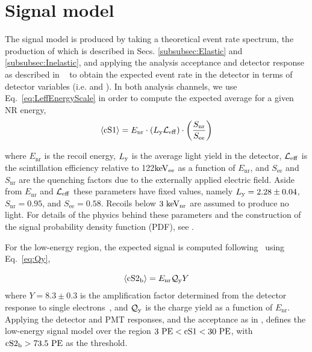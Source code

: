 \section{Signal model}
\label{subsec:SignalModel}
The signal model is produced by taking a theoretical event rate spectrum, the production of which is described in Secs. \ref{subsubsec:Elastic} and \ref{subsubsec:Inelastic}, and applying the analysis acceptance and detector response as described in ~\cite{Aprile:2012vw}  to obtain the expected event rate in the detector in terms of detector variables (i.e. \cSi{} and \cSiib{}). 
In both analysis channels, we use Eq.~\ref{eq:LeffEnergyScale} in order to compute the expected average \cSi{} for a given NR energy,
\begin{equation}
\label{eq:LeffEnergyScale}
	\langle \mathrm{cS1} \rangle = E_{\mathrm{nr}} \cdot (L_{\mathrm{y}} \mathcal{L}_{\mathrm{eff}}) \cdot   \left(\frac{S_\mathrm{nr}}{S_\mathrm{ee}}\right) 
\end{equation}

where $E_\mathrm{nr}$ is the recoil energy, $L_{\mathrm{y}}$ is the average light yield in the detector, $\mathcal{L}_{\mathrm{eff}}$ is the scintillation efficiency relative to 122$\mathrm{keV_\mathrm{ee}}$ as a function of $E_\mathrm{nr}$, and $S_\mathrm{ee}$ and $S_\mathrm{nr}$ are the quenching factors due to the externally applied electric field. Aside from $E_\mathrm{nr}$ and $\mathcal{L}_{\mathrm{eff}}$ these parameters have fixed values, namely $L_{\mathrm{y}} = 2.28 \pm 0.04$, $S_\mathrm{nr} = 0.95$, and $S_\mathrm{ee} = 0.58$. Recoils below $3~\mathrm{keV_\mathrm{nr}}$ are assumed to produce no light. For details of the physics behind these parameters and the construction of the signal probability density function (PDF), see \cite{Aprile:2012vw,xe100_run_combination}. 

For the low-energy region, the expected \cSiib{} signal is computed following~\cite{DataMCXenon} using Eq.~\ref{eq:Qy},


\begin{equation}
\label{eq:Qy}
	\langle \mathrm{cS2}_\mathrm{b} \rangle = E_{\mathrm{nr}}\mathcal{Q}_{\mathrm{y}} Y   
\end{equation}
where $Y = 8.3 \pm 0.3$ 
is the amplification factor determined from the detector response to single electrons~\cite{XenonSingleElectron}, and $\mathcal{Q}_{\mathrm{y}}$ is the charge yield as a function of $E_\mathrm{nr}$. Applying the detector and PMT responses, and the acceptance as in \cite{xe100_run_combination}, defines the low-energy signal model over the region $3~\mathrm{PE} < \mathrm{cS1}{} < 30~\mathrm{PE}$, with $\mathrm{cS2}_\mathrm{b}{} > 73.5~\mathrm{PE}$ as the \Sii{} threshold.


